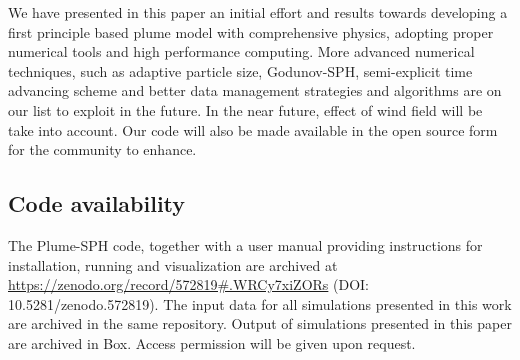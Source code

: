 \documentclass[journal abbreviation, manuscript]{copernicus}
\begin{document}
We have presented in this paper an initial effort and results towards developing a first principle based plume model with comprehensive physics, adopting proper numerical tools and high performance computing. More advanced numerical techniques, such as adaptive particle size, Godunov-SPH, semi-explicit time advancing scheme and better data management strategies and algorithms are on our list to exploit in the future. In the near future, effect of wind field will be take into account. Our code will also be made available in the open source form for the community to enhance.

\subsection{Code availability}
The Plume-SPH code, together with a user manual providing instructions for installation, running and visualization are archived at \url{ https://zenodo.org/record/572819#.WRCy7xiZORs} (DOI: 10.5281/zenodo.572819). The input data for all simulations presented in this work are archived in the same repository. Output of simulations presented in this paper are archived in Box. Access permission will be given upon request.

%
%
%
\end{document}
